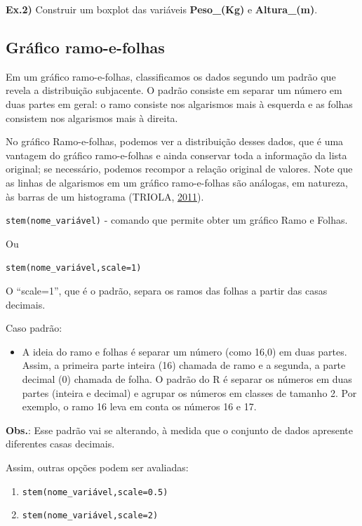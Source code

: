 \documentclass[12pt,brazil,oneside]{book}
\providecommand{\tightlist}{%
  \setlength{\itemsep}{0pt}\setlength{\parskip}{0pt}}
\begin{document}
\textbf{Ex.2)} Construir um boxplot das variáveis \textbf{Peso\_(Kg)} e
\textbf{Altura\_(m)}.

\hypertarget{grafico-ramo-e-folhas}{%
\subsection{Gráfico ramo-e-folhas}\label{grafico-ramo-e-folhas}}

Em um gráfico ramo-e-folhas, classificamos os dados segundo um padrão
que revela a distribuição subjacente. O padrão consiste em separar um
número em duas partes em geral: o ramo consiste nos algarismos mais à
esquerda e as folhas consistem nos algarismos mais à direita.

No gráfico Ramo-e-folhas, podemos ver a distribuição desses dados, que é
uma vantagem do gráfico ramo-e-folhas e ainda conservar toda a
informação da lista original; se necessário, podemos recompor a relação
original de valores. Note que as linhas de algarismos em um gráfico
ramo-e-folhas são análogas, em natureza, às barras de um histograma
(TRIOLA, \protect\hyperlink{ref-triola1999}{2011}).

\texttt{stem(nome\_variável)} - comando que permite obter um gráfico
Ramo e Folhas.

Ou

\texttt{stem(nome\_variável,scale=1)}

O ``scale=1'', que é o padrão, separa os ramos das folhas a partir das
casas decimais.

Caso padrão:

\begin{itemize}
\tightlist
\item
  A ideia do ramo e folhas é separar um número (como 16,0) em duas
  partes. Assim, a primeira parte inteira (16) chamada de ramo e a
  segunda, a parte decimal (0) chamada de folha. O padrão do R é separar
  os números em duas partes (inteira e decimal) e agrupar os números em
  classes de tamanho 2. Por exemplo, o ramo 16 leva em conta os números
  16 e 17.
\end{itemize}

\textbf{Obs.}: Esse padrão vai se alterando, à medida que o conjunto de
dados apresente diferentes casas decimais.

Assim, outras opções podem ser avaliadas:

\begin{enumerate}
\def\labelenumi{\alph{enumi})}
\item
  \texttt{stem(nome\_variável,scale=0.5)}
\item
  \texttt{stem(nome\_variável,scale=2)}
\end{enumerate}
\end{document}

